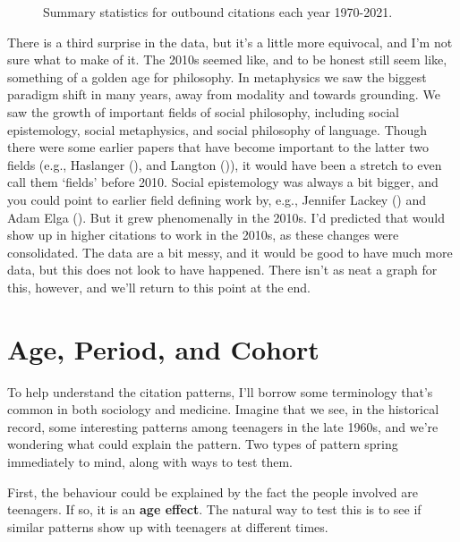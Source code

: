 \documentclass[
  12pt,
  letterpaper,
  DIV=11,
  numbers=noendperiod]{scrartcl}
\begin{document}
\begin{figure}
\begin{minipage}{\linewidth}
{}


\end{minipage}%

\caption{\label{fig-overall-median-mode}Summary statistics for outbound
citations each year 1970-2021.}

\end{figure}%

There is a third surprise in the data, but it's a little more equivocal,
and I'm not sure what to make of it. The 2010s seemed like, and to be
honest still seem like, something of a golden age for philosophy. In
metaphysics we saw the biggest paradigm shift in many years, away from
modality and towards grounding. We saw the growth of important fields of
social philosophy, including social epistemology, social metaphysics,
and social philosophy of language. Though there were some earlier papers
that have become important to the latter two fields (e.g., Haslanger
(), and Langton
()), it would have been a stretch to
even call them `fields' before 2010. Social epistemology was always a
bit bigger, and you could point to earlier field defining work by, e.g.,
Jennifer Lackey () and Adam Elga
(). But it grew phenomenally in the 2010s.
I'd predicted that would show up in higher citations to work in the
2010s, as these changes were consolidated. The data are a bit messy, and
it would be good to have much more data, but this does not look to have
happened. There isn't as neat a graph for this, however, and we'll
return to this point at the end.

\section{Age, Period, and Cohort}\label{sec-apc-described}

To help understand the citation patterns, I'll borrow some terminology
that's common in both sociology and medicine. Imagine that we see, in
the historical record, some interesting patterns among teenagers in the
late 1960s, and we're wondering what could explain the pattern. Two
types of pattern spring immediately to mind, along with ways to test
them.

First, the behaviour could be explained by the fact the people involved
are teenagers. If so, it is an \textbf{age effect}. The natural way to
test this is to see if similar patterns show up with teenagers at
different times.
\end{document}
